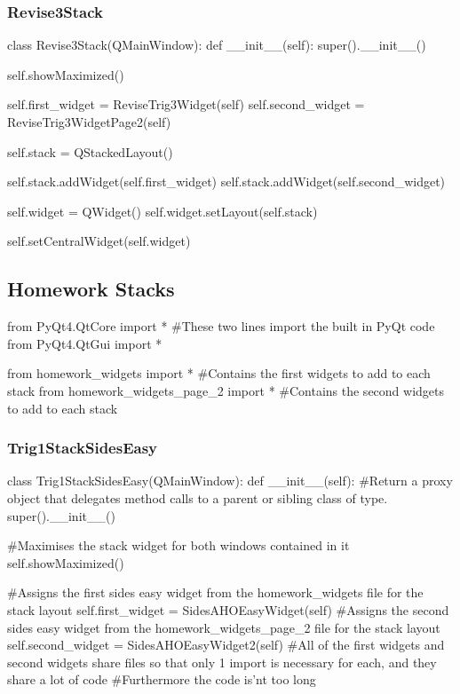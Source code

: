 \begin{landscape}
\subsubsection{Revise3Stack}

\begin{python}
class Revise3Stack(QMainWindow):
    def __init__(self):
        super().__init__()

        self.showMaximized()
        
        self.first_widget = ReviseTrig3Widget(self)
        self.second_widget = ReviseTrig3WidgetPage2(self)

        self.stack = QStackedLayout()

        self.stack.addWidget(self.first_widget)
        self.stack.addWidget(self.second_widget)

        self.widget = QWidget()
        self.widget.setLayout(self.stack)

        self.setCentralWidget(self.widget)
\end{python}

\subsection{Homework Stacks}

\begin{python}
from PyQt4.QtCore import * #These two lines import the built in PyQt code
from PyQt4.QtGui import *

from homework_widgets import * #Contains the first widgets to add to each stack
from homework_widgets_page_2 import * #Contains the second widgets to add to each stack
\end{python}

\subsubsection{Trig1StackSidesEasy}

\begin{python}
class Trig1StackSidesEasy(QMainWindow):
    def __init__(self):
        #Return a proxy object that delegates method calls to a parent or sibling class of type.
        super().__init__()

        #Maximises the stack widget for both windows contained in it
        self.showMaximized()

        #Assigns the first sides easy widget from the homework_widgets file for the stack layout
        self.first_widget = SidesAHOEasyWidget(self)
        #Assigns the second sides easy widget from the homework_widgets_page_2 file for the stack layout
        self.second_widget = SidesAHOEasyWidget2(self)
        #All of the first widgets and second widgets share files so that only 1 import is necessary for each, and they share a lot of code
        #Furthermore the code is'nt too long


\end{python}
\end{landscape}
